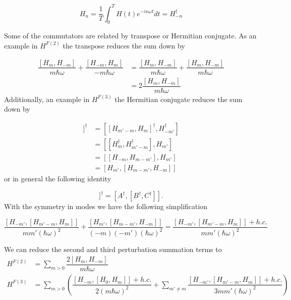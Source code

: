 \begin{equation}
  H_n = \dfrac{1}{T} \int_0^T H(t) e^{-in\omega t} dt = H_{-n}^{\dagger}
\end{equation}

Some of the commutators are related by transpose or Hermitian conjugate.
As an example in $H^{F(2)}$ the transpose reduces the sum down by

\begin{align}
  \dfrac{[H_m,H_{-m}]}{m\hbar \omega} + \dfrac{[H_{-m}, H_m]}{-m\hbar\omega} &= \dfrac{[H_m,H_{-m}]}{m\hbar \omega} + \dfrac{[H_m, H_{-m}]}{m\hbar\omega} \\
  &= 2\dfrac{[H_m,H_{-m}]}{m\hbar \omega}
\end{align}
Additionally, an example in $H^{F(3)}$ the Hermitian conjugate reduces the sum down by

\begin{align}
  [H_{-m'},[H_{m'-m},H_m]]^{\dagger} &= [[H_{m'-m},H_m]^{\dagger}, H_{-m'}^{\dagger}] \nonumber \\
  &= [ [H_m^{\dagger}, H_{m'-m}^{\dagger}], H_{m'}] \nonumber \\
  &= [ [H_{-m}, H_{m-m'}], H_{m'}] \nonumber \\
  &= [H_{m'}, [H_{m-m'}, H_{-m}]]
\end{align}
or in general the following identity

\begin{equation}
  [A,[B,C]]^{\dagger} = [A^{\dagger}, [B^{\dagger}, C^{\dagger}]].
\end{equation}
With the symmetry in modes we have the following simplification

\begin{equation}
  \dfrac{[H_{-m'},[H_{m'-m},H_m]]}{mm'(\hbar\omega)^2} + \dfrac{[H_{m'},[H_{m-m'},H_{-m}]]}{(-m)(-m')(\hbar\omega)^2} = \dfrac{[H_{-m'},[H_{m'-m},H_m]] + h.c.}{mm'(\hbar\omega)^2}
\end{equation}

We can reduce the second and third perturbation summation terms to
\begin{align}
  H^{F(2)} &= \sum_{m> 0} \dfrac{2[H_m, H_{-m}]}{m\hbar\omega} \\
  H^{F(3)} &= \sum_{m> 0} \left( \dfrac{[H_{-m} , [H_0, H_m]] + h.c.}{2(m\hbar\omega)^2} + \sum_{m'\neq m} \dfrac{[H_{-m'}, [H_{m'-m}, H_m]] + h.c.}{3mm'(\hbar\omega)^2} \right)
\end{align}

